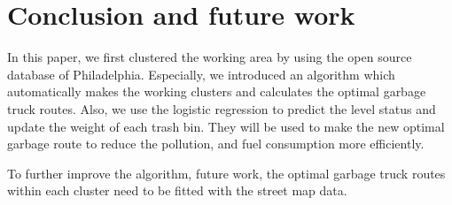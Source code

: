 \documentclass[conference,compsoc]{IEEEtran}
\begin{document}
\section{Conclusion and future work}
In this paper, we first clustered the working area by using the open source database of Philadelphia. Especially, we introduced an algorithm which automatically makes the working clusters and calculates the optimal garbage truck routes. Also, we use the logistic regression to predict the level status and update the weight of each trash bin. They will be used to make the new optimal garbage route to reduce the pollution, and fuel consumption more efficiently.  

To further improve the algorithm, future work, the optimal garbage truck routes within each cluster need to be fitted with the street map data.
 
 
 
 
 
 
 
\ifCLASSOPTIONcompsoc



 
 
 
 
 
 
 
\end{document}
